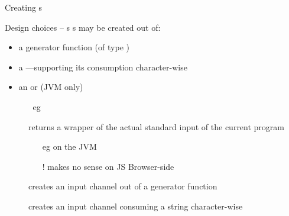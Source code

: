 \documentclass[handout]{beamer}
\begin{document}
\begin{frame}[allowframebreaks]{Creating s}

    \begin{block}{Design choices -- s}
        s may be created out of:
        \begin{itemize}
            \item a \alert{generator} function (of type \alert{})
            \item a ---supporting its consumption \alert{character-wise}
            \item an  or  (JVM only)
            \begin{itemize}
                \item[eg] 
            \end{itemize}
        \end{itemize}
    \end{block}
    \begin{description}
        \item[] returns a wrapper of the actual standard input of the current program
        \begin{itemize}\small
            \item[eg]  on the JVM
            \item[!] makes no sense on \alert{JS Browser-side}
        \end{itemize}
        \item[] creates an input channel out of a generator function
        \item[] creates an input channel consuming a string \alert{character-wise}
    \end{description}


    \framebreak


\end{frame}
\end{document}
